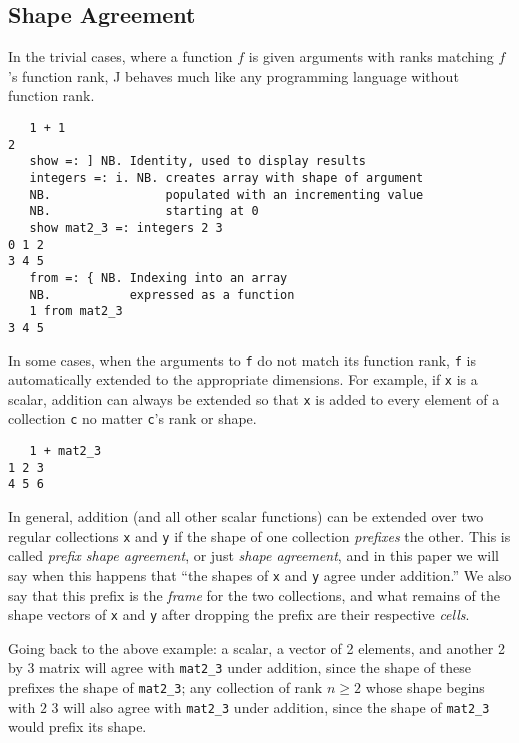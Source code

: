 \subsection{Shape Agreement}
In the trivial cases, where a function $f$ is given arguments with ranks matching $f$'s function rank, 
J behaves much like any programming language without function rank. 

\begin{singlespacing}
\begin{small}
\begin{verbatim}
   1 + 1
2
   show =: ] NB. Identity, used to display results
   integers =: i. NB. creates array with shape of argument
   NB.                populated with an incrementing value
   NB.                starting at 0
   show mat2_3 =: integers 2 3
0 1 2
3 4 5
   from =: { NB. Indexing into an array
   NB.           expressed as a function
   1 from mat2_3
3 4 5
\end{verbatim}
\end{small}
\end{singlespacing}

In some cases, when the arguments to \texttt{f} do not match its function rank, \texttt{f} is automatically extended to the appropriate dimensions.
For example, if \texttt{x} is a scalar, addition can always be extended so that \texttt{x} is added to every element of a collection \texttt{c} 
no matter \texttt{c}'s rank or shape. 

\begin{singlespacing}
\begin{small}
\begin{verbatim}
   1 + mat2_3
1 2 3
4 5 6
\end{verbatim}
\end{small}
\end{singlespacing}

In general, addition (and all other scalar functions) can be extended over two regular collections \texttt{x} and \texttt{y}  
if the shape of one collection \textit{prefixes} the other.
This is called \textit{prefix shape agreement}, or just \textit{shape agreement},\cite{rankanduni} 
and in this paper we will say when this happens that ``the shapes of \texttt{x} and \texttt{y} agree under addition.''
We also say that this prefix is the \textit{frame} for the two collections,
and what remains of the shape vectors of \texttt{x} and \texttt{y} after dropping the prefix are their respective \textit{cells}.

Going back to the above example: 
a scalar, a vector of 2 elements, and another 2 by 3 matrix will agree with \texttt{mat2\_3} under addition, 
since the shape of these prefixes the shape of \texttt{mat2\_3}; 
any collection of rank $n \ge 2$ whose shape begins with $2$ $3$ will also agree with 
\texttt{mat2\_3} under addition, since the shape of \texttt{mat2\_3} would prefix its shape.

